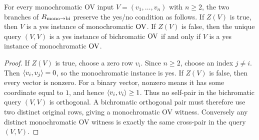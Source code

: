 \begin{lemma}
  \label{lem:mono-to-bi-ov-query-correctness}
  For every monochromatic OV input $V=(v_1,\ldots,v_n)$ with $n\geq2$, the two
  branches of $R_{\rm mono\to bi}$ preserve the yes/no condition as follows.
  If $Z(V)$ is true, then $V$ is a yes instance of monochromatic $\mathrm{OV}$.  If
  $Z(V)$ is false, then the unique query $(V,V)$ is a yes instance of
  bichromatic $\mathrm{OV}$ if and only if $V$ is a yes instance of monochromatic
  $\mathrm{OV}$.
\end{lemma}
\begin{proof}
  If $Z(V)$ is true, choose a zero row $v_i$.  Since $n\geq2$, choose an index
  $j\neq i$.  Then $\left\langle v_i,v_j\right\rangle=0$, so the monochromatic instance is yes.
  If $Z(V)$ is false, then every vector is nonzero.  For a binary vector,
  nonzero means it has some coordinate equal to $1$, and hence
  $\left\langle v_i,v_i\right\rangle\geq1$.  Thus no self-pair in the bichromatic query $(V,V)$ is
  orthogonal.  A bichromatic orthogonal pair must therefore use two distinct
  original rows, giving a monochromatic OV witness.  Conversely any distinct
  monochromatic OV witness is exactly the same cross-pair in the query
  $(V,V)$.
\end{proof}

